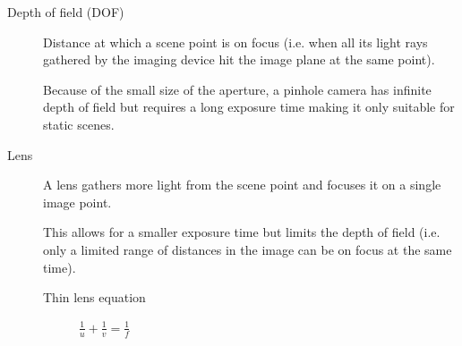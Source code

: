 \begin{description}
    \item[Depth of field (DOF)] 
        Distance at which a scene point is on focus (i.e. when all its light rays gathered by the imaging device hit the image plane at the same point).

        \begin{remark}
            Because of the small size of the aperture, a pinhole camera has infinite depth of field
            but requires a long exposure time making it only suitable for static scenes.
        \end{remark}

    \item[Lens] 
        A lens gathers more light from the scene point and focuses it on a single image point.

        This allows for a smaller exposure time but limits the depth of field (i.e. only a limited range of distances in the image can be on focus at the same time).

        \begin{description}
            \item[Thin lens equation] 
                $\frac{1}{u} + \frac{1}{v} = \frac{1}{f}$
        \end{description}
\end{description}